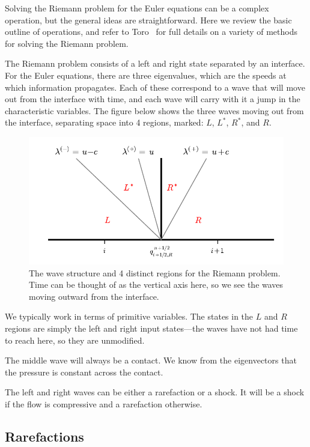 Solving the Riemann problem for the Euler equations can be a complex
operation, but the general ideas are straightforward.  Here we review
the basic outline of operations, and refer to Toro~\cite{toro:1997} for
full details on a variety of methods for solving the Riemann problem.

The Riemann problem consists of a left and right state separated by an
interface.  For the Euler equations, there are three eigenvalues, which
are the speeds at which information propagates.  Each of these
correspond to a wave that will move out from the interface with time,
and each wave will carry with it a jump in the characteristic variables.  The
figure below shows the three waves moving out from the interface,
separating space into 4 regions, marked: $L$, $L^*$, $R^*$, and $R$.
\begin{figure}[h]
\centering
\includegraphics[width=\linewidth]{riemann-waves}
\caption[The Riemann problem wave structure for the Euler
  equations]{The wave structure and 4 distinct regions for the
  Riemann problem.  Time can be thought of as the vertical axis here,
  so we see the waves moving outward from the interface.}
\end{figure}
We typically work in terms of primitive variables.  The states in the
$L$ and $R$ regions are simply the left and right input states---the
waves have not had time to reach here, so they are unmodified.



The middle wave will always be a contact.  We know from the eigenvectors
that the pressure is constant across the contact.

The left and right waves can be either a rarefaction or a shock.  It will
be a shock if the flow is compressive and a rarefaction otherwise.


\subsection{Rarefactions}

